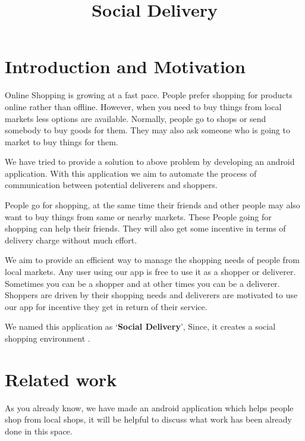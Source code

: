 \documentclass{report}
\begin{document}
\title{\Huge  Social Delivery\linebreak}
\date{}
\maketitle
\setlength{\columnsep}{0.7cm}


\chapter{Introduction and Motivation}

\par \Large Online Shopping is growing at a fast pace. People prefer shopping for products online rather than offline. However, when you need to buy things from local markets less options are available. Normally, people go to shops or send somebody to buy goods for them. They may also ask someone who is going to market to buy things for them. 

We have tried to provide a solution to above problem by developing an android application. With this application we aim to automate the process of communication between potential deliverers and shoppers.


People go for shopping, at the same time their friends and other people may also want to buy things from same or nearby markets. These People going for shopping can help their friends. They will also get some incentive in terms of delivery charge without much effort.

We aim to provide an efficient way to manage the shopping needs of people from local markets. Any user using our app is free to use it as a shopper or deliverer. Sometimes you can be a shopper and at other times you can be a deliverer. Shoppers are driven by their shopping needs and deliverers are motivated to use our app for incentive they get in return of their service.  

We named this application as `\textbf{Social Delivery}', Since,  it creates a social shopping environment . 



\chapter{Related work}
\par As you already know,  we have made an android application which helps people shop from local shops, it will be helpful to discuss what work has been already done in this space.
\end{document}
